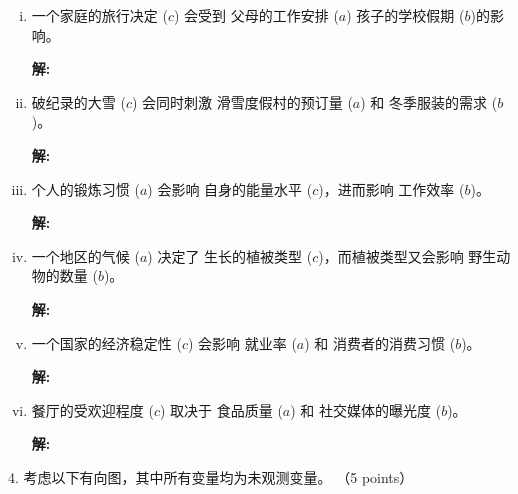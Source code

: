 \documentclass[8pt]{article}
\begin{document}
\begin{enumerate}[(i)]
        \item 
        一个家庭的旅行决定 (\(c\)) 会受到 父母的工作安排 (\(a\)) 孩子的学校假期 (\(b\))的影响。

        \textbf{\large 解:}
        \vspace{3em}
        
        \item 
        破纪录的大雪 (\(c\))  会同时刺激 滑雪度假村的预订量 (\(a\)) 和 冬季服装的需求 (\(b\))。

        \textbf{\large 解:}
        \vspace{3em}

        \item 
        个人的锻炼习惯 (\(a\)) 会影响 自身的能量水平 (\(c\))，进而影响 工作效率 (\(b\))。

        \textbf{\large 解:}
        \vspace{3em}

        \item 
        一个地区的气候 (\(a\)) 决定了 生长的植被类型 (\(c\))，而植被类型又会影响 野生动物的数量 (\(b\))。

        \textbf{\large 解:}
        \vspace{3em}

        \item 
        一个国家的经济稳定性 (\(c\)) 会影响 就业率 (\(a\)) 和 消费者的消费习惯 (\(b\))。

        \textbf{\large 解:}
        \vspace{3em}
        
        \item 
        餐厅的受欢迎程度 (\(c\)) 取决于 食品质量 (\(a\)) 和 社交媒体的曝光度 (\(b\))。
        
        \textbf{\large 解:}
        \vspace{3em}

    \end{enumerate}




4. 考虑以下有向图，其中所有变量均为未观测变量。 （5 points）

    \begin{figure}[h]
        \centering
    \end{figure}
\end{document}
